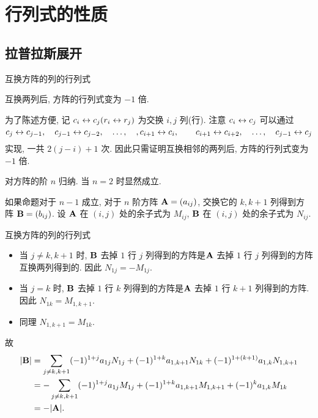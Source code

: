 \section{行列式的性质}

\subsection{拉普拉斯展开}

\begin{frame}{互换方阵的列的行列式}
	\onslide<+->
	\begin{alertblock@}
		互换两列后, 方阵的行列式变为 $-1$ 倍.
	\end{alertblock@}
	\onslide<+->
	为了陈述方便, 记 \alert{$c_i\leftrightarrow c_j (r_i\leftrightarrow r_j)$} 为交换 $i,j$ 列(行).
	\onslide<+->
	注意 $c_i\leftrightarrow c_j$ 可以通过
	\[c_j\leftrightarrow c_{j-1},\quad c_{j-1}\leftrightarrow c_{j-2},\quad \dots,\quad, c_{i+1}\leftrightarrow c_i,\qquad
	c_{i+1}\leftrightarrow c_{i+2},\quad \dots,\quad c_{j-1}\leftrightarrow c_j\]
	实现, 一共 $2(j-i)+1$ 次.
	\onslide<+->
	因此只需证明互换相邻的两列后, 方阵的行列式变为 $-1$ 倍.

	\onslide<+->
	对方阵的阶 $n$ 归纳.
	\onslide<+->
	当 $n=2$ 时显然成立.

	\onslide<+->
	如果命题对于 $n-1$ 成立, 对于 $n$ 阶方阵 ${\mathbf{A}}=(a_{ij})$, 交换它的 $k,k+1$ 列得到方阵 ${\mathbf{B}}=(b_{ij})$.
	\onslide<+->
	设 ${\mathbf{A}}$ 在 $(i,j)$ 处的余子式为 $M_{ij}$, ${\mathbf{B}}$ 在 $(i,j)$ 处的余子式为 $N_{ij}$.
\end{frame}


\begin{frame}{互换方阵的列的行列式}
	\onslide<+->
	\begin{itemize}
		\item 当 $j\neq k,k+1$ 时, ${\mathbf{B}}$ 去掉 $1$ 行 $j$ 列得到的方阵是${\mathbf{A}}$ 去掉 $1$ 行 $j$ 列得到的方阵互换两列得到的.
		\onslide<+->
		因此 $N_{1j}=-M_{1j}$.
		\item 当 $j=k$ 时, ${\mathbf{B}}$ 去掉 $1$ 行 $k$ 列得到的方阵是${\mathbf{A}}$ 去掉 $1$ 行 $k+1$ 列得到的方阵.
		\onslide<+->
		因此 $N_{1k}=M_{1,k+1}$.
		\item 同理 $N_{1,k+1}=M_{1k}$.
	\end{itemize}
	\onslide<+->
	故
	\begin{align*}
		|{\mathbf{B}}|&=\sum_{j\neq k,k+1} (-1)^{1+j}a_{1j} N_{1j}
		+(-1)^{1+k}a_{1,k+1}N_{1k}+(-1)^{1+(k+1)}a_{1,k}N_{1,k+1}\\
		&=-\sum_{j\neq k,k+1} (-1)^{1+j}a_{1j} M_{1j}
		+(-1)^{1+k}a_{1,k+1}M_{1,k+1}+(-1)^{k}a_{1,k}M_{1k}\\
		&=-|{\mathbf{A}}|.
	\end{align*}
\end{frame}



